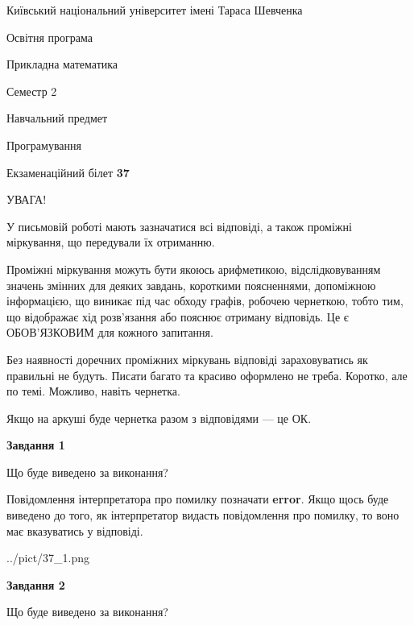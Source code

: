 \documentclass[12pt, ukrainian]{article}
\begin{document}
{{\begin {small}\par
{ \center  Київський національний університет імені Тараса Шевченка \par}
{\parbox {5 cm}{Освітня програма \hfill}{\parbox {7 cm}{Прикладна математика \hfill}}\parbox {6 cm}{\hfill Семестр 2}}\par
{\parbox {5 cm} {Навчальний предмет \hfill}\parbox {7 cm}{Програмування \hfill}\parbox {6cm}{\hfill}\par}\vspace{-7pt} \end{small}}{\center Екзаменаційний білет \No \textbf
{ 37 }\par}}
{
\begin {large}
УВАГА!

У письмовій роботі мають зазначатися всі відповіді, а також проміжні міркування, що передували їх отриманню.

Проміжні міркування можуть бути якоюсь арифметикою, відслідковуванням зна\-чень змінних для деяких завдань,
короткими поясненнями, допоміжною інформацією, що виникає під час обходу графів, робочею чернеткою,
тобто тим, що відображає хід розв’язання або пояснює отриману відповідь.
Це є ОБОВ’ЯЗКОВИМ для кожного запитання.

Без наявності доречних проміжних міркувань відповіді зараховуватись як правиль\-ні не будуть.
Писати багато та красиво оформлено не треба. Коротко, але по темі. Можли\-во, навіть чернетка.

Якщо на аркуші буде чернетка разом з відповідями --- це ОК.

\newpage

{\begin {center}\textbf{Завдання 1}\end {center}}\par
Що буде виведено за виконання?

Повідомлення інтерпретатора про помилку позначати \textbf{error}.
Якщо щось буде виведено до того, як інтерпретатор видасть повідомлення про помилку, 
то воно має вказуватись у відповіді. \par


\begin{center}
	{../pict/37_1.png}
\end{center}
\newpage

{\begin {center}\textbf{Завдання 2}\end {center}}\par
Що буде виведено за виконання?


\end{large}}
\end{document}
